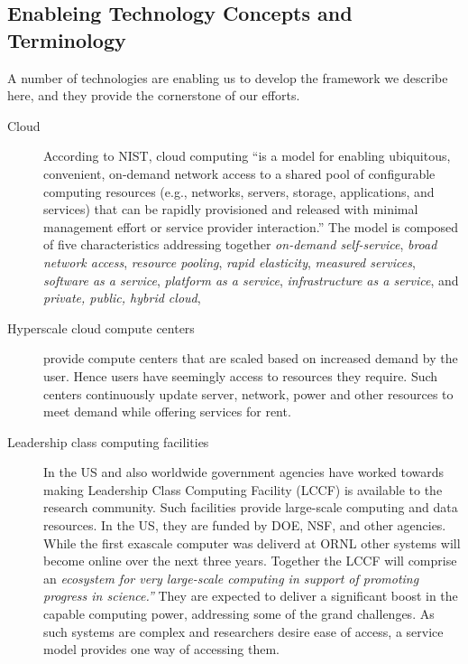 

\subsection{Enableing Technology Concepts and Terminology}

A number of technologies are enabling us to develop the framework we
describe here, and they provide the cornerstone of our efforts.

\begin{description}

\item[Cloud]
     According to NIST, cloud computing ``is a model for enabling
     ubiquitous, convenient, on-demand network access to a shared pool
     of configurable computing resources (e.g., networks, servers,
     storage, applications, and services) that can be rapidly
     provisioned and released with minimal management effort or
     service provider interaction.'' The model is composed of five
     characteristics addressing together {\em on-demand self-service},
     {\em broad network access}, {\em resource pooling}, {\em rapid
     elasticity}, {\em measured services}, {\em software as a
     service}, {\em platform as a service}, {\em infrastructure as a
     service}, and {\em private, public, hybrid cloud},

\item[Hyperscale cloud compute centers]
     provide compute centers that are scaled based on increased demand
     by the user. Hence users have seemingly access to resources they
     require. Such centers continuously update server, network, power
     and other resources to meet demand while offering services for
     rent.

\item[Leadership class computing facilities] 
     In the US and also worldwide \cite{www-top500} government
     agencies have worked towards making Leadership Class Computing
     Facility (LCCF) is available to the research community. Such
     facilities provide large-scale computing and data resources. In
     the US, they are funded by DOE, NSF, and other
     agencies. While the first exascale computer was deliverd at
     ORNL \cite{www-top500} other systems will become online over the
     next three years. Together the LCCF will comprise an {\em ecosystem
     for very large-scale computing in support of promoting progress
     in science.''} They are expected to deliver a significant boost
     in the capable computing power, addressing some of the grand
     challenges. As such systems are complex and researchers desire
     ease of access, a service model provides one way of accessing
     them.


\end{description}
